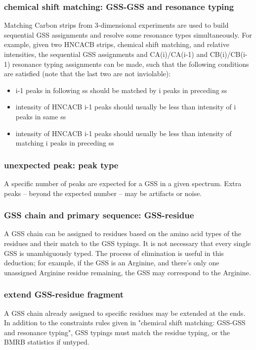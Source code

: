 \subsubsection{chemical shift matching: GSS-GSS and resonance typing}
Matching Carbon strips from 3-dimensional experiments are used to build 
sequential GSS assignments and resolve some resonance types simultaneously. 
For example, given two HNCACB strips, chemical shift matching, and relative 
intensities, the sequential GSS assignments and CA(i)/CA(i-1) and CB(i)/CB(i-1) 
resonance typing assignments can be made, such that the following conditions
are satisfied (note that the last two are not inviolable):
\begin{itemize}
  \item i-1 peaks in following ss should be matched by i peaks in preceding ss
  \item intensity of HNCACB i-1 peaks should usually be less than intensity of i peaks in same ss
  \item intensity of HNCACB i-1 peaks should usually be less than intensity of matching i peaks in preceding ss
\end{itemize}

\subsubsection{unexpected peak: peak type}
A specific number of peaks are expected for a GSS in a given spectrum.
Extra peaks -- beyond the expected number -- may be artifacts or noise.

\subsubsection{GSS chain and primary sequence: GSS-residue}
A GSS chain can be assigned to residues based on the amino acid types of the 
residues and their match to the GSS typings.  It is not necessary that every
single GSS is unambiguously typed.
The process of elimination is useful in this deduction; for example, if the
GSS is an Arginine, and there's only one unassigned Arginine residue remaining,
the GSS may correspond to the Arginine.

\subsubsection{extend GSS-residue fragment}
A GSS chain already assigned to specific residues may be extended at the ends.
In addition to the constraints rules given in 
"chemical shift matching: GSS-GSS and resonance typing",
GSS typings must match the residue typing, or the BMRB statistics if untyped.

